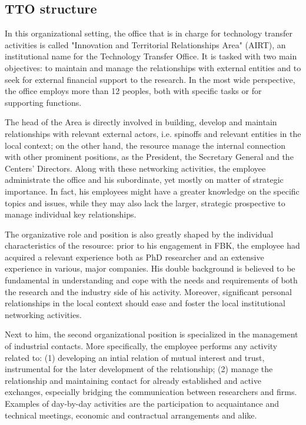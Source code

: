 \subsection{TTO structure}

In this organizational setting, the office that is in charge for technology transfer activities is called "Innovation and Territorial Relationships Area" (AIRT), an institutional name for the Technology Transfer Office. It is tasked with two main objectives: to maintain and manage the relationships with external entities and to seek for external financial support to the research. In the most wide perspective, the office employs more than 12 peoples, both with specific tasks or for supporting functions. 

The head of the Area is directly involved in building, develop and maintain relationships with relevant external actors, i.e. spinoffs and relevant entities in the local context; on the other hand, the resource manage the internal connection with other prominent positions, as the President, the Secretary General and the Centers' Directors. Along with these networking activities, the employee administrate the office and his subordinate, yet mostly on matter of strategic importance. In fact, his employees might have a greater knowledge on the specific topics and issues, while they may also lack the larger, strategic prospective to manage individual key relationships.

The organizative role and position is also greatly shaped by the individual characteristics of the resource: prior to his engagement in FBK, the employee had acquired a relevant experience both as PhD researcher and an extensive experience in various, major companies. His double background is believed to be fundamental in understanding and cope with the needs and requirements of both the research and the industry side of his activity. Moreover, significant personal relationships in the local context should ease and foster the local institutional networking activities.

Next to him, the second organizational position is specialized in the management of industrial contacts. More specifically, the employee performs any activity related to: (1) developing an intial relation of mutual interest and trust, instrumental for the later development of the relationship; (2) manage the relationship and maintaining contact for already established and active exchanges, especially bridging the communication between researchers and firms. Examples of day-by-day activities are the participation to acquaintance and technical meetings, economic and contractual arrangements and alike.

